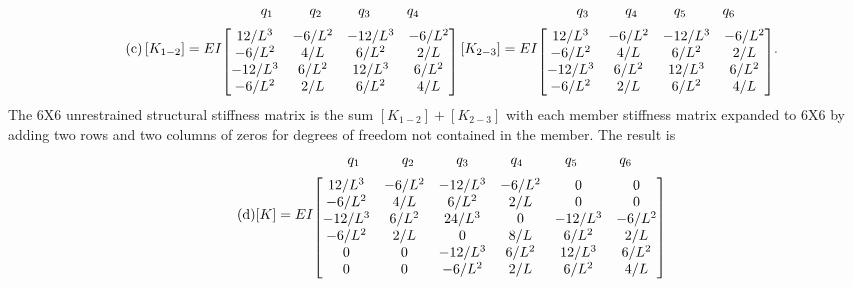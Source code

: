 \documentclass{AeroStructure-ERJohnson}
\begin{document}
\begin{example}
\begin{align}\label{eq16.6c}\tag{c}
\left[K_{1-2}\right]=E I
\begin{array}{@{}c@{}}
{\arraycolsep=13pt\begin{array}{@{}cccc@{}}
q_1 & q_2 & q_3 & q_4
\end{array}}\\[6pt]
\left[\begin{array}{@{}cccc@{}}12 / L^{3} & -6 / L^{2} & -12 / L^{3} & -6 / L^{2} \\-6 / L^{2} & 4 / L & 6 / L^{2} & 2 / L \\-12 / L^{3} & 6 / L^{2} & 12 / L^{3} & 6 / L^{2} \\
-6 / L^{2} & 2 / L & 6 / L^{2} & 4 / L\end{array}\right]
\end{array}
\left[K_{2-3}\right]=E I
\begin{array}{@{}c@{}}
{\arraycolsep=13pt\begin{array}{@{}cccc@{}}
q_3 & q_4 & q_5 & q_6
\end{array}}\\[6pt]
\left[\begin{array}{@{}cccc@{}}12 / L^{3} & -6 / L^{2} & -12 / L^{3} & -6 / L^{2} \\-6 / L^{2} & 4 / L & 6 / L^{2} & 2 / L \\-12 / L^{3} & 6 / L^{2} & 12 / L^{3} & 6 / L^{2} \\-6 / L^{2} & 2 / L & 6 / L^{2} & 4 / L\end{array}\right]
\end{array}.
\end{align}
The 6X6 unrestrained structural stiffness matrix is the sum $\left[K_{1-2}\right]+\left[K_{2-3}\right]$ with each member stiffness matrix expanded to 6X6 by adding two rows and two columns of zeros for degrees of freedom not contained in the member. The result is
\begin{align}\label{eq16.6d}\tag{d}
[K]=E I
\begin{array}{@{}c@{}}
{\arraycolsep=15pt\begin{array}{@{}cccccc@{}}
q_1 & q_2 & q_3 & q_4 & q_5 & q_6
\end{array}}\\[6pt]
\left[\begin{array}{@{}cccccc@{}}12 / L^{3} & -6 / L^{2} & -12 / L^{3} & -6 / L^{2} & 0 & 0 \\-6 / L^{2} & 4 / L & 6 / L^{2} & 2 / L & 0 & 0 \\-12 / L^{3} & 6 / L^{2} & 24 / L^{3} & 0 & -12 / L^{3} & -6 / L^{2} \\-6 / L^{2} & 2 / L & 0 & 8 / L & 6 / L^{2} & 2 / L \\0 & 0 & -12 / L^{3} & 6 / L^{2} & 12 / L^{3} & 6 / L^{2} \\0 & 0 & -6 / L^{2} & 2 / L & 6 / L^{2} & 4 / L\end{array}\right]

\end{array}
\end{align}
\end{example}
\end{document}
